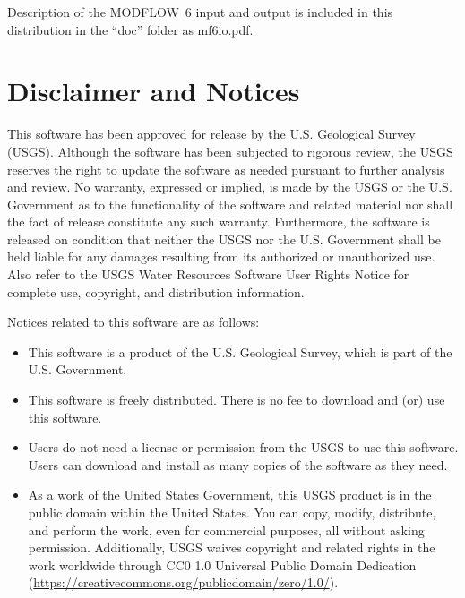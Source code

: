 \documentclass[11pt,twoside,twocolumn]{usgsreport}
\makeatletter
\newcommand{\customlabel}[2]{%
   \protected@write \@auxout {}{\string \newlabel {#1}{{#2}{\thepage}{#2}{#1}{}} }%
   \hypertarget{#1}{}
}
\newcommand{\inreferences}{%
\renewcommand{\theequation}{R--\arabic{equation}}%
\setcounter{equation}{0}%
\renewcommand{\thefigure}{R--\arabic{figure}}%
\setcounter{figure}{0}%
\renewcommand{\thetable}{R--\arabic{table}}%
\setcounter{table}{0}%
\renewcommand{\thepage}{R--\arabic{page}}%
\setcounter{page}{1}%
}
\newcounter{appendixno}
\newcommand{\inappendix}{%
\addtocounter{appendixno}{1}%
\renewcommand{\theequation}{\Alph{appendixno}--\arabic{equation}}%
\setcounter{equation}{0}%
\renewcommand{\thefigure}{\Alph{appendixno}--\arabic{figure}}%
\setcounter{figure}{0}%
\renewcommand{\thetable}{\Alph{appendixno}--\arabic{table}}%
\setcounter{table}{0}%
\renewcommand{\thepage}{\Alph{appendixno}--\arabic{page}}%
\setcounter{page}{1}%
}
\makeatother
\begin{document}
\noindent Description of the MODFLOW~6 input and output is included in this distribution in the ``doc'' folder as mf6io.pdf.


\section{Disclaimer and Notices}

This software has been approved for release by the U.S. Geological Survey (USGS). Although the software has been subjected to rigorous review, the USGS reserves the right to update the software as needed pursuant to further analysis and review. No warranty, expressed or implied, is made by the USGS or the U.S. Government as to the functionality of the software and related material nor shall the fact of release constitute any such warranty. Furthermore, the software is released on condition that neither the USGS nor the U.S. Government shall be held liable for any damages resulting from its authorized or unauthorized use. Also refer to the USGS Water Resources Software User Rights Notice for complete use, copyright, and distribution information.

Notices related to this software are as follows:
\begin{itemize}
\item This software is a product of the U.S. Geological Survey, which is part of the U.S. Government.

\item This software is freely distributed. There is no fee to download and (or) use this software.

\item Users do not need a license or permission from the USGS to use this software. Users can download and install as many copies of the software as they need.

\item As a work of the United States Government, this USGS product is in the public domain within the United States. You can copy, modify, distribute, and perform the work, even for commercial purposes, all without asking permission. Additionally, USGS waives copyright and related rights in the work worldwide through CC0 1.0 Universal Public Domain Dedication (\url{https://creativecommons.org/publicdomain/zero/1.0/}).
\end{itemize}


\newpage
\ifx\usgsdirector\undefined
{}
\else
\inreferences
\REFSECTION
\fi



\newpage
\inappendix
{}
\customlabel{app:A}{A}



\justifying
\vspace*{\fill}
\clearpage
\pagestyle{backofreport}
\makebackcover
\end{document}
